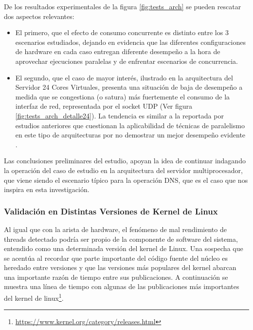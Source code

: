 De los resultados experimentales de la figura \ref{fig:tests_arch} se pueden rescatar dos aspectos relevantes:
\begin{itemize}
\item El primero, que el efecto de consumo concurrente es distinto entre los 3 escenarios estudiados, dejando en evidencia que las diferentes configuraciones de hardware en cada caso entregan diferente desempeño a la hora de aprovechar ejecuciones paralelas y de enfrentar escenarios de concurrencia.
\item El segundo, que el caso de mayor interés, ilustrado en la arquitectura del Servidor 24 Cores Virtuales, presenta una situación de baja de desempeño a medida que se congestiona (o satura) más fuertemente el consumo de la interfaz de red, representada por el socket UDP (Ver figura \ref{fig:tests_arch_detalle24}). La tendencia es similar a la reportada por estudios anteriores que cuestionan la aplicabilidad de técnicas de paralelismo en este tipo de arquitecturas por no demostrar un mejor desempeño evidente \cite{post:facebook, paper:toshiba, tesis:diegoDCC}.
\end{itemize}

Las conclusiones preliminares del estudio, apoyan la idea de continuar indagando la operación del caso de estudio en la arquitectura del servidor multiprocesador, que viene siendo el escenario típico para la operación DNS, que es el caso que nos inspira en esta investigación.

\subsubsection{Validación en Distintas Versiones de Kernel de Linux}

Al igual que con la arista de hardware, el fenómeno de mal rendimiento de threads detectado podría ser propio de la componente de software del sistema, entendido como una determinada versión del kernel de Linux. Una sospecha que se acentúa al recordar que parte importante del código fuente del núcleo es heredado entre versiones y que las versiones más populares del kernel abarcan una importante razón de tiempo entre sus publicaciones. A continuación se muestra una línea de tiempo con algunas de las publicaciones más importantes del kernel de linux\footnote{\url{https://www.kernel.org/category/releases.html}}.


